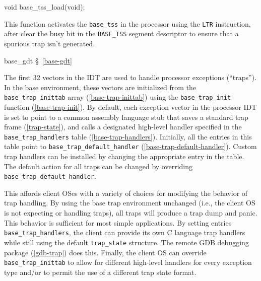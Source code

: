 \label{base-tss-load}
\begin{apisyn}

	\funcproto void base_tss_load(void);
\end{apisyn}
\begin{apidesc}
	This function activates the {\tt base_tss} in the processor
	using the {\tt LTR} instruction,
	after clear the busy bit
	in the {\tt BASE_TSS} segment descriptor
	to ensure that a spurious trap isn't generated.
\end{apidesc}
\begin{apidep}
	\item[base_gdt]		\S~\ref{base-gdt}
\end{apidep}

\label{kern-x86-base-trap}

The first 32 vectors in the IDT are used to handle processor exceptions
(``traps'').
In the base \oskit{} environment,
these vectors are initialized from the
{\tt base_trap_inittab} array (\ref{base-trap-inittab})
using the {\tt base_trap_init} function (\ref{base-trap-init}).
By default,
each exception vector in the processor IDT is set to point to a
common assembly language stub that saves a standard trap frame
(\ref{trap-state}),
and calls a designated high-level handler specified
in the {\tt base_trap_handlers} table (\ref{base-trap-handlers}).
Initially, all the entries in this table point to
{\tt base_trap_default_handler} (\ref{base-trap-default-handler}).
Custom trap handlers can be installed by changing
the appropriate entry in the table.
The default action for all traps can be changed by overriding
{\tt base_trap_default_handler}.

This affords client OSes with a variety of choices for modifying the
behavior of trap handling.
By using the base trap environment unchanged
(i.e., the client OS is not expecting or handling traps),
all traps will produce a trap dump and panic.
This behavior is sufficient for most simple \oskit{} applications.
By setting entries {\tt base_trap_handlers},
the client can provide its own C language trap handlers while still using
the default {\tt trap_state} structure.
The \oskit{} remote GDB debugging package (\ref{gdb-trap}) does this.
Finally, the client OS can override {\tt base_trap_inittab} to allow for
different high-level handlers for every exception type and/or to permit
the use of a different trap state format.

